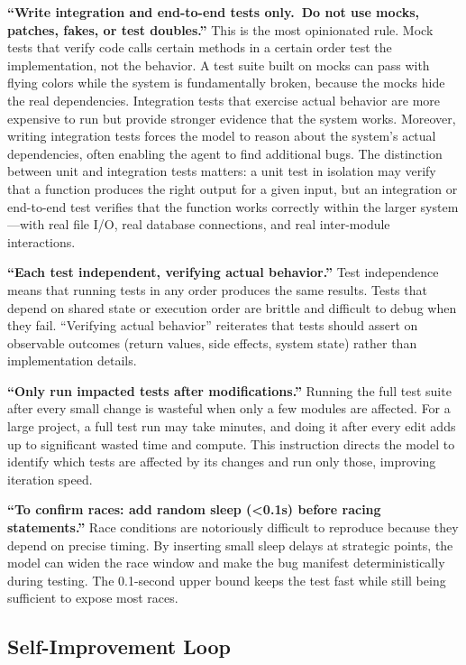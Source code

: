 \documentclass{article}
\begin{document}
\textbf{``Write integration and end-to-end tests only.\ Do not use mocks, patches, fakes, or test doubles.''}  This is the most opinionated rule.  Mock tests that verify code calls certain methods in a certain order test the implementation, not the behavior.  A test suite built on mocks can pass with flying colors while the system is fundamentally broken, because the mocks hide the real dependencies.  Integration tests that exercise actual behavior are more expensive to run but provide stronger evidence that the system works.  Moreover, writing integration tests forces the model to reason about the system's actual dependencies, often enabling the agent to find additional bugs.  The distinction between unit and integration tests matters: a unit test in isolation may verify that a function produces the right output for a given input, but an integration or end-to-end test verifies that the function works correctly within the larger system---with real file I/O, real database connections, and real inter-module interactions.

\textbf{``Each test independent, verifying actual behavior.''}  Test independence means that running tests in any order produces the same results.  Tests that depend on shared state or execution order are brittle and difficult to debug when they fail.  ``Verifying actual behavior'' reiterates that tests should assert on observable outcomes (return values, side effects, system state) rather than implementation details.

\textbf{``Only run impacted tests after modifications.''}  Running the full test suite after every small change is wasteful when only a few modules are affected.  For a large project, a full test run may take minutes, and doing it after every edit adds up to significant wasted time and compute.  This instruction directs the model to identify which tests are affected by its changes and run only those, improving iteration speed.

\textbf{``To confirm races: add random sleep (<0.1s) before racing statements.''}  Race conditions are notoriously difficult to reproduce because they depend on precise timing.  By inserting small sleep delays at strategic points, the model can widen the race window and make the bug manifest deterministically during testing.  The 0.1-second upper bound keeps the test fast while still being sufficient to expose most races.

\subsection{Self-Improvement Loop}
\end{document}
